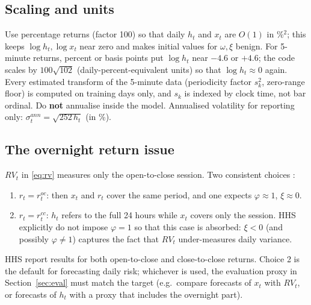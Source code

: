 \documentclass[11pt]{article}
\begin{document}
\subsection{Scaling and units}
Use percentage returns (factor 100) so that daily $h_t$ and $x_t$ are $O(1)$ in \%$^2$;
this keeps $\log h_t,\log x_t$ near zero and makes initial values for $\omega,\xi$ benign.
For 5-minute returns, percent or basis points put $\log h_t$ near $-4.6$ or $+4.6$; the code
scales by $100\sqrt{102}$ (daily-percent-equivalent units) so that $\log h_t\approx0$ again.
Every estimated transform of the 5-minute data (periodicity factor $s_k^2$, zero-range floor)
is computed on training days only, and $s_k$ is indexed by clock time, not bar ordinal.
Do \textbf{not} annualise inside the model. Annualised volatility for reporting only:
$\sigma^{ann}_t = \sqrt{252\,h_t}$ (in \%).

\subsection{The overnight return issue}
$RV_t$ in \eqref{eq:rv} measures only the open-to-close session. Two consistent choices
\cite{HHS2012}:
\begin{enumerate}
\item $r_t=r^{oc}_t$: then $x_t$ and $r_t$ cover the same period, and one expects
  $\varphi\approx1$, $\xi\approx 0$.
\item $r_t=r^{cc}_t$: $h_t$ refers to the full 24 hours while $x_t$ covers only the
  session. HHS explicitly do not impose $\varphi=1$ so that this case is absorbed: $\xi<0$
  (and possibly $\varphi\ne1$) captures the fact that $RV_t$ under-measures daily variance.
\end{enumerate}
HHS report results for both open-to-close and close-to-close returns. Choice 2 is the
default for forecasting daily risk; whichever is used, the evaluation proxy in
Section~\ref{sec:eval} must match the target (e.g.\ compare forecasts of $x_t$ with $RV_t$, or
forecasts of $h_t$ with a proxy that includes the overnight part).
\end{document}
